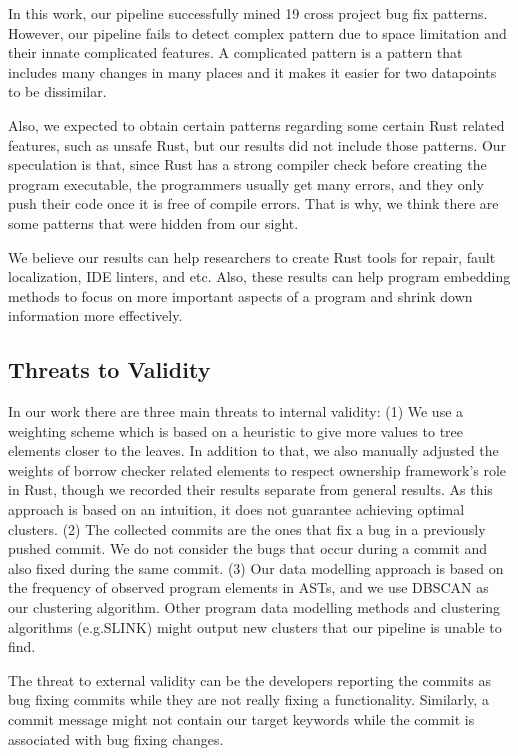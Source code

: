 In this work, our pipeline successfully mined 19 cross project bug fix patterns. However, our pipeline fails to detect complex pattern due to space limitation and their innate complicated features. A complicated pattern is a pattern that includes many changes in many places and it makes it easier for two datapoints to be dissimilar. 

Also, we expected to obtain certain patterns regarding some certain Rust related features, such as unsafe Rust, but our results did not include those patterns. Our speculation is that, since Rust has a strong compiler check before creating the program executable, the programmers usually get many errors, and they only push their code once it is free of compile errors. That is why, we think there are some patterns that were hidden from our sight.

We believe our results can help researchers to create Rust tools for repair, fault localization, IDE linters, and etc. Also, these results can help program embedding methods to focus on more important aspects of a program and shrink down information more effectively.

\subsection{Threats to Validity}

In our work there are three main threats to internal validity: (1) We use a weighting scheme which is based on a heuristic to give more values to tree elements closer to the leaves. In addition to that, we also manually adjusted the weights of borrow checker related elements to respect ownership framework's role in Rust, though we recorded their results separate from general results. As this approach is based on an intuition, it does not guarantee achieving optimal clusters. (2) The collected commits are the ones that fix a bug in a previously pushed commit. We do not consider the bugs that occur during a commit and also fixed during the same commit. (3) Our data modelling approach is based on the frequency of observed program elements in ASTs, and we use DBSCAN as our clustering algorithm. Other program data modelling methods and clustering algorithms (e.g.SLINK) might output new clusters that our pipeline is unable to find. 

The threat to external validity can be the developers reporting the commits as bug fixing commits while they are not really fixing a functionality. Similarly, a commit message might not contain our target keywords while the commit is associated with bug fixing changes.
